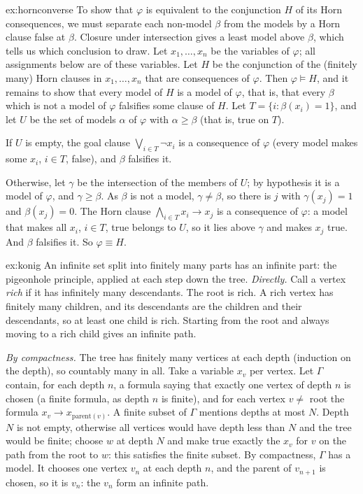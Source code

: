 \begin{solution}{ex:hornconverse}
\idea To show that $\varphi$ is equivalent to the conjunction $H$ of its Horn consequences, we must separate each non-model $\beta$ from
the models by a Horn clause false at $\beta$. Closure under intersection gives a least model above $\beta$, which tells us which
conclusion to draw.
\writeup Let $x_1,\dots,x_n$ be the variables of $\varphi$; all assignments below are of these variables. Let $H$ be the conjunction of the
(finitely many) Horn clauses in $x_1,\dots,x_n$ that are consequences of $\varphi$. Then $\varphi\models H$, and it remains to show that every
model of $H$ is a model of $\varphi$, that is, that every $\beta$ which is not a model of $\varphi$ falsifies some clause of $H$. Let
$T=\{i:\beta(x_i)=1\}$, and let $U$ be the set of models $\alpha$ of $\varphi$ with $\alpha\ge\beta$ (that is, true on $T$).

If $U$ is empty, the goal clause $\bigvee_{i\in T}\neg x_i$ is a consequence of $\varphi$ (every model makes some $x_i$, $i\in T$, false), and $\beta$ falsifies it.

Otherwise, let $\gamma$ be the intersection of the members of $U$; by hypothesis it is a model of $\varphi$, and $\gamma\ge\beta$. As $\beta$ is not a model, $\gamma\ne\beta$,
so there is $j$ with $\gamma(x_j)=1$ and $\beta(x_j)=0$. The Horn clause $\bigwedge_{i\in T}x_i\to x_j$ is a consequence of $\varphi$: a model that makes all $x_i$,
$i\in T$, true belongs to $U$, so it lies above $\gamma$ and makes $x_j$ true. And $\beta$ falsifies it. So $\varphi\equiv H$.
\end{solution}

\begin{solution}{ex:konig}
\idea An infinite set split into finitely many parts has an infinite part: the pigeonhole principle, applied at each step
down the tree.
\writeup \emph{Directly.} Call a vertex \emph{rich} if it has infinitely many descendants. The root is rich. A rich vertex has finitely
many children, and its descendants are the children and their descendants, so at least one child is rich. Starting
from the root and always moving to a rich child gives an infinite path.

\emph{By compactness.} The tree has finitely many vertices at each depth (induction on the depth), so countably many in all.
Take a variable $x_v$ per vertex. Let $\Gamma$ contain, for each depth $n$, a formula saying that exactly one vertex of depth $n$ is
chosen (a finite formula, as depth $n$ is finite), and for each vertex $v\ne$ root the formula $x_v\to x_{\text{parent}(v)}$. A finite subset of
$\Gamma$ mentions depths at most $N$. Depth $N$ is not empty, otherwise all vertices would have depth less than $N$ and the tree
would be finite; choose $w$ at depth $N$ and make true exactly the $x_v$ for $v$ on the path from the root to $w$: this satisfies
the finite subset. By compactness, $\Gamma$ has a model. It chooses one vertex $v_n$ at each depth $n$, and the parent of $v_{n+1}$ is
chosen, so it is $v_n$: the $v_n$ form an infinite path.
\end{solution}

